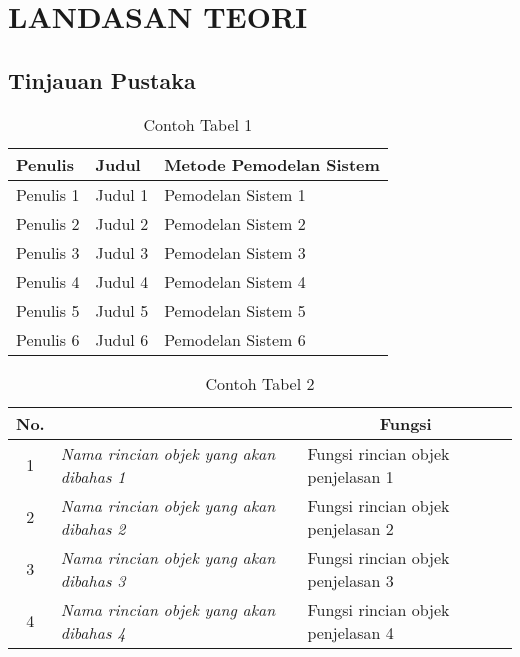 \chapter[LANDASAN TEORI]{\\ LANDASAN TEORI}

\section{Tinjauan Pustaka}
\lipsum[1]

\begin{table}[H]
    \centering
    \caption{Contoh Tabel 1}
    \label{t risetPemodelan}
    \begin{tabularx}{\linewidth}{
        |p{}%
        |p{}%
        |p{}|%
    }
        \hline
        Penulis & Judul & Metode Pemodelan Sistem\\ \hline
        Penulis 1 & Judul 1 & Pemodelan Sistem 1 \\ \hline
        Penulis 2 & Judul 2 & Pemodelan Sistem 2 \\ \hline
        Penulis 3 & Judul 3 & Pemodelan Sistem 3 \\ \hline
        Penulis 4 & Judul 4 & Pemodelan Sistem 4 \\ \hline
        Penulis 5 & Judul 5 & Pemodelan Sistem 5 \\ \hline
        Penulis 6 & Judul 6 & Pemodelan Sistem 6 \\ \hline
    \end{tabularx}
\end{table}

\begin{table}[H]
    \centering
    \caption{Contoh Tabel 2}
    \label{t blok}
    \begin{tabular}{|c|l|l|}
        \hline
        \rowcolor[HTML]{C0C0C0} 
        {\color[HTML]{000000} No.} & \multicolumn{1}{c|}{\cellcolor[HTML]{C0C0C0}{\color[HTML]{000000} Nama}} & \multicolumn{1}{c|}{\cellcolor[HTML]{C0C0C0}Fungsi}  \\ \hline
        \rowcolor[HTML]{FFFFFF} 
        1 & \textit{Nama rincian objek yang akan dibahas 1} & Fungsi rincian objek penjelasan 1 \\ \hline
        2 & \textit{Nama rincian objek yang akan dibahas 2} & Fungsi rincian objek penjelasan 2 \\ \hline
        3 & \textit{Nama rincian objek yang akan dibahas 3} & Fungsi rincian objek penjelasan 3 \\ \hline
        4 & \textit{Nama rincian objek yang akan dibahas 4} & Fungsi rincian objek penjelasan 4 \\ \hline
    \end{tabular}
\end{table}

